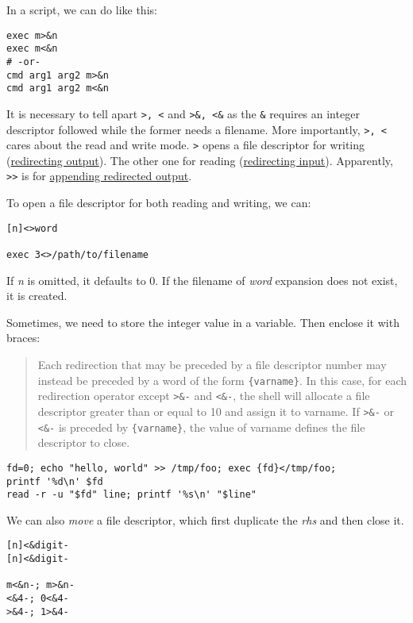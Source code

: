 In a script, we can do like this:

\begin{lstlisting}
exec m>&n
exec m<&n
# -or-
cmd arg1 arg2 m>&n
cmd arg1 arg2 m<&n
\end{lstlisting}

It is necessary to tell apart \verb|>, <| and \verb|>&, <&| as the
\verb|&| requires an integer descriptor followed while the former
needs a filename. More importantly, \verb|>, <| cares about the
read and write mode. \verb|>| opens a file descriptor for writing
(\uline{redirecting output}). The other one for reading
(\uline{redirecting input}). Apparently, \verb|>>| is for
\uline{appending redirected output}.

To open a file descriptor for both reading and
writing, we can:

\begin{lstlisting}
[n]<>word

exec 3<>/path/to/filename
\end{lstlisting}

If \textit{n} is omitted, it defaults to 0. If the filename of
\textit{word} expansion does not exist, it is created.

Sometimes, we need to store the integer value in a variable. Then
enclose it with braces:

\begin{quotation}
  Each redirection that may be preceded by a file descriptor
  number may instead be preceded by a word of the form
  \verb|{varname}|. In this case, for each redirection operator
  except \verb|>&-| and \verb|<&-|, the shell will allocate a file
  descriptor greater than or equal to 10 and assign it to varname.
  If \verb|>&-| or \verb|<&-| is preceded by \verb|{varname}|, the
  value of varname defines the file descriptor to close.
\end{quotation}

\begin{minipage}{1.0\linewidth}
\begin{lstlisting}
fd=0; echo "hello, world" >> /tmp/foo; exec {fd}</tmp/foo;
printf '%d\n' $fd
read -r -u "$fd" line; printf '%s\n' "$line"
\end{lstlisting}
\end{minipage}

We can also \textit{move} a file descriptor, which first duplicate
the \textit{rhs} and then close it.

\begin{lstlisting}
[n]<&digit-
[n]<&digit-

m<&n-; m>&n-
<&4-; 0<&4-
>&4-; 1>&4-
\end{lstlisting}

